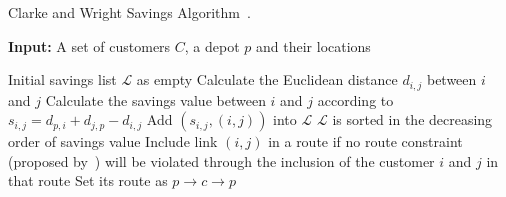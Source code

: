 \documentclass[journal]{IEEEtran}
\begin{document}
\begin{algorithm}[htbp]
	\caption{\label{CWSA}Clarke and Wright Savings Algorithm~\cite{pichpibul2012an}.}
	{\bf Input:} A set of customers $C$, a depot $p$ and their locations
	\begin{algorithmic}[1]
		\State Initial savings list $\mathcal{L}$ as empty
		\State Calculate the Euclidean distance $d_{i,j}$ between $i$ and $j$
		\State Calculate the savings value between $i$ and $j$ according to $s_{i,j}=d_{p,i}+d_{j,p}-d_{i,j}$
		\State Add $(s_{i,j}, (i,j))$ into $\mathcal{L}$
		\EndFor
		\State $\mathcal{L}$ is sorted in the decreasing order of savings value
		\State Include link $(i,j)$ in a route if no route constraint (proposed by~\cite{clarke1964scheduling}) will be violated through the inclusion of the customer $i$ and $j$ in that route
		\EndFor
		\State Set its route as $p \rightarrow c \rightarrow p$
		\EndFor
	\end{algorithmic}
\end{algorithm}
\end{document}
